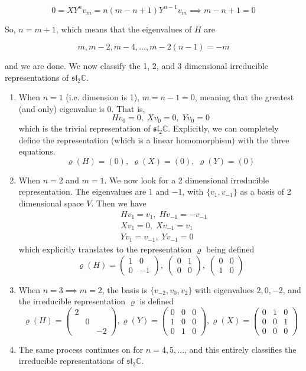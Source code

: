 \documentclass{article}
\theoremstyle{remark}
\theoremstyle{definition}
\begin{document}
  \[0 = X Y^n v_m = n (m-n+1) Y^{n-1} v_m \implies m-n+1=0\]

So, $n = m+1$, which means that the eigenvalues of $H$ are

  \[m, m-2, m-4, \ldots, m - 2(n-1) = -m\]

and we are done. We now classify the 1, 2, and 3 dimensional irreducible representations of $\mathfrak{sl}_2 \mathbb{C}$. 
\begin{enumerate}
  \item When $n = 1$ (i.e. dimension is 1), $m = n-1 = 0$, meaning that the greatest (and only) eigenvalue is $0$. That is, 
  \[H v_0 = 0,\; X v_0 = 0,\; Y v_0 = 0\]
  which is the trivial representation of $\mathfrak{sl}_2 \mathbb{C}$. Explicitly, we can completely define the representation (which is a linear homomorphism) with the three equations. 
  \[\varrho(H) = (0),\; \varrho(X) = (0),\; \varrho(Y) = (0)\]

  \item When $n = 2$ and $m=1$. We now look for a 2 dimensional irreducible representation. The eigenvalues are $1$ and $-1$, with $\{v_1, v_{-1}\}$ as a basis of 2 dimensional space $V$. Then we have 
    \begin{align*}
      & Hv_1 = v_1, \; Hv_{-1} = - v_{-1} \\
      & X v_1 = 0, \; X v_{-1} = v_1 \\
      & Y v_1 = v_{-1}, \; Y v_{-1} = 0
    \end{align*}
  which explicitly translates to the representation $\varrho$ being defined
    \[\varrho(H) = \begin{pmatrix}
    1&0\\0&-1
    \end{pmatrix}, \; \begin{pmatrix}
    0&1\\0&0
    \end{pmatrix}, \; \begin{pmatrix}
    0&0\\1&0
    \end{pmatrix}\]

  \item When $n=3 \implies m=2$, the basis is $\{v_{-2}, v_0, v_2\}$ with eigenvalues $2, 0, -2$, and the irreducible representation $\varrho$ is defined
    \[\varrho(H) = \begin{pmatrix}
    2&&\\&0&\\&&-2
    \end{pmatrix}, \varrho(Y) = \begin{pmatrix}
    0&0&0\\1&0&0\\0&1&0
    \end{pmatrix}, \varrho(X) = \begin{pmatrix}
    0&1&0\\0&0&1\\0&0&0
    \end{pmatrix}\]
  \item The same process continues on for $n=4, 5, ...$, and this entirely classifies the irreducible representations of $\mathfrak{sl}_2 \mathbb{C}$. 
\end{enumerate}
\end{document}
